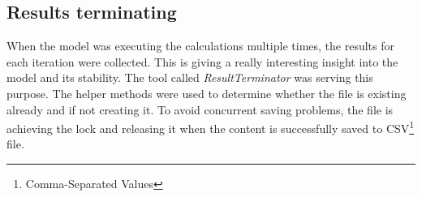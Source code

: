 \subsection{Results terminating}\label{subsec:results-terminating}
When the model was executing the calculations multiple times, the results for each iteration were collected.
This is giving a really interesting insight into the model and its stability.
The tool called \mbox{\textit{ResultTerminator}} was serving this purpose.
The helper methods were used to determine whether the file is existing already and if not creating it.
To avoid concurrent saving problems, the file is achieving the lock and releasing it when the content is successfully saved to CSV\footnote{Comma-Separated Values} file.
